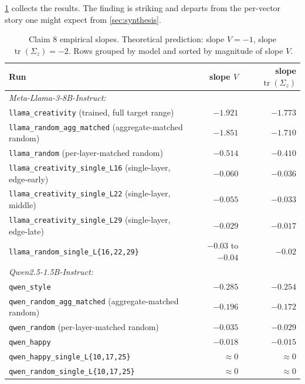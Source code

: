 \ref{tab:empirical-scaling} collects the results. The finding is striking and departs from the per-vector story one might expect from \ref{sec:synthesis}.

\begin{table}[htbp]
  \centering
  \small
  \caption{Claim 8 empirical slopes. Theoretical prediction: slope $V = -1$, slope $\operatorname{tr}(\Sigma_z) = -2$. Rows grouped by model and sorted by magnitude of slope $V$.}
  \label{tab:empirical-scaling}
  \begin{tabular}{@{}lrr@{}}
    \toprule
    Run & slope $V$ & slope $\operatorname{tr}(\Sigma_z)$ \\
    \midrule
    \multicolumn{3}{l}{\emph{Meta-Llama-3-8B-Instruct:}} \\
    \texttt{llama\_creativity} (trained, full target range) & $\mathbf{-1.921}$ & $-1.773$ \\
    \texttt{llama\_random\_agg\_matched} (aggregate-matched random) & $\mathbf{-1.851}$ & $-1.710$ \\
    \texttt{llama\_random} (per-layer-matched random) & $-0.514$ & $-0.410$ \\
    \texttt{llama\_creativity\_single\_L16} (single-layer, edge-early) & $-0.060$ & $-0.036$ \\
    \texttt{llama\_creativity\_single\_L22} (single-layer, middle) & $-0.055$ & $-0.033$ \\
    \texttt{llama\_creativity\_single\_L29} (single-layer, edge-late) & $-0.029$ & $-0.017$ \\
    \texttt{llama\_random\_single\_L\{16,22,29\}} & $-0.03$ to $-0.04$ & $-0.02$ \\
    \midrule
    \multicolumn{3}{l}{\emph{Qwen2.5-1.5B-Instruct:}} \\
    \texttt{qwen\_style} & $-0.285$ & $-0.254$ \\
    \texttt{qwen\_random\_agg\_matched} (aggregate-matched random) & $-0.196$ & $-0.172$ \\
    \texttt{qwen\_random} (per-layer-matched random) & $-0.035$ & $-0.029$ \\
    \texttt{qwen\_happy} & $-0.018$ & $-0.015$ \\
    \texttt{qwen\_happy\_single\_L\{10,17,25\}} & $\approx 0$ & $\approx 0$ \\
    \texttt{qwen\_random\_single\_L\{10,17,25\}} & $\approx 0$ & $\approx 0$ \\
    \bottomrule
  \end{tabular}
\end{table}

